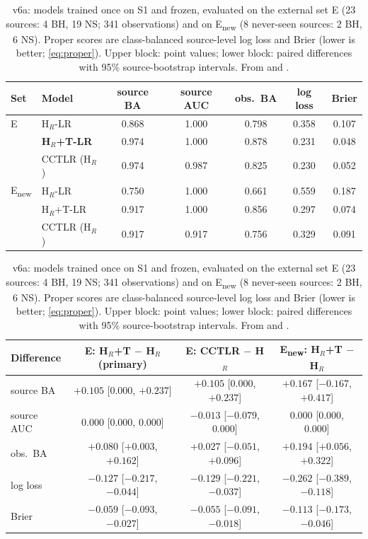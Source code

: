 \begin{table}[htbp]
\centering\small
\caption[v6a external validation]{\Primary{} v6a: models trained once on S1 and frozen, evaluated on the external set E
(23 sources: 4 BH, 19 NS; 341 observations) and on E\textsubscript{new} (8 never-seen sources: 2 BH, 6 NS). Proper scores
are class-balanced source-level log loss and Brier (lower is better; \cref{eq:proper}). Upper block: point values; lower
block: paired differences with 95\% source-bootstrap intervals. From  and
.}
\label{tab:p3v6a}
\setlength{\tabcolsep}{4pt}
\begin{tabular}{@{}llccccc@{}}
\toprule
Set & Model & source BA & source AUC & obs.\ BA & log loss & Brier \\
\midrule
E & H$_R$-LR & 0.868 & 1.000 & 0.798 & 0.358 & 0.107 \\
 & \textbf{H$_R$+T-LR} & 0.974 & 1.000 & 0.878 & 0.231 & 0.048 \\
 & CCTLR (H$_R$) & 0.974 & 0.987 & 0.825 & 0.230 & 0.052 \\
E\textsubscript{new} & H$_R$-LR & 0.750 & 1.000 & 0.661 & 0.559 & 0.187 \\
 & H$_R$+T-LR & 0.917 & 1.000 & 0.856 & 0.297 & 0.074 \\
 & CCTLR (H$_R$) & 0.917 & 0.917 & 0.756 & 0.329 & 0.091 \\
\bottomrule
\end{tabular}

\vspace{0.8em}
\begin{tabular}{@{}lccc@{}}
\toprule
Difference & E: H$_R$+T $-$ H$_R$ (\textbf{primary}) & E: CCTLR $-$ H$_R$ & E\textsubscript{new}: H$_R$+T $-$ H$_R$ \\
\midrule
source BA & $+0.105$ [0.000, $+0.237$] & $+0.105$ [0.000, $+0.237$] & $+0.167$ [$-0.167$, $+0.417$] \\
source AUC & $0.000$ [0.000, 0.000] & $-0.013$ [$-0.079$, 0.000] & $0.000$ [0.000, 0.000] \\
obs.\ BA & $+0.080$ [$+0.003$, $+0.162$] & $+0.027$ [$-0.051$, $+0.096$] & $+0.194$ [$+0.056$, $+0.322$] \\
log loss & $-0.127$ [$-0.217$, $-0.044$] & $-0.129$ [$-0.221$, $-0.037$] & $-0.262$ [$-0.389$, $-0.118$] \\
Brier & $-0.059$ [$-0.093$, $-0.027$] & $-0.055$ [$-0.091$, $-0.018$] & $-0.113$ [$-0.173$, $-0.046$] \\
\bottomrule
\end{tabular}
\end{table}

